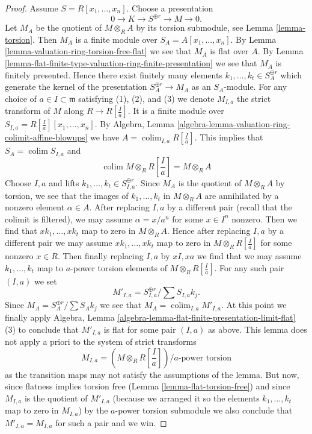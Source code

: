 \documentclass[10pt,a4paper]{amsart}
\theoremstyle{plain}
\theoremstyle{definition}
\theoremstyle{remark}
\numberwithin{equation}{subsection}
\def\colim{\mathop{\mathrm{colim}}\nolimits}
\begin{document}
\begin{proof}
\medskip\noindent
Assume $S = R[x_1, \ldots, x_n]$. Choose a presentation
$$
0 \to K \to S^{\oplus r} \to M \to 0.
$$
Let $M_A$ be the quotient of $M \otimes_R A$ by its torsion submodule, see
Lemma \ref{lemma-torsion}. Then $M_A$ is a finite module over
$S_A = A[x_1, \ldots, x_n]$. By
Lemma \ref{lemma-valuation-ring-torsion-free-flat}
we see that $M_A$ is flat over $A$. By
Lemma \ref{lemma-flat-finite-type-valuation-ring-finite-presentation}
we see that $M_A$ is finitely presented. Hence there exist finitely many
elements $k_1, \ldots, k_t \in S_A^{\oplus r}$ which generate the
kernel of the presentation $S_A^{\oplus r} \to M_A$ as
an $S_A$-module. For any choice of $a \in I \subset \mathfrak m$
satisfying (1), (2), and (3) we denote $M_{I, a}$ the strict transform of
$M$ along $R \to R[\frac{I}{a}]$. It is a finite module over
$S_{I, a} = R[\frac{I}{a}][x_1, \ldots, x_n]$. By
Algebra, Lemma \ref{algebra-lemma-valuation-ring-colimit-affine-blowups}
we have $A = \colim_{I, a} R[\frac{I}{a}]$.
This implies that $S_A = \colim S_{I, a}$ and
$$
\colim M \otimes_R R[\textstyle{\frac{I}{a}}] = M \otimes_R A
$$
Choose $I, a$ and lifts $k_1, \ldots, k_t \in S_{I, a}^{\oplus r}$.
Since $M_A$ is the quotient of $M \otimes_R A$
by torsion, we see that the images of $k_1, \ldots, k_t$ in $M \otimes_R A$
are annihilated by a nonzero element $\alpha \in A$.
After replacing $I, a$ by a different pair
(recall that the colimit is filtered),
we may assume $\alpha = x/a^n$ for some $x \in I^n$ nonzero.
Then we find that $x k_1, \ldots, x k_t$ map to zero in $M \otimes_R A$.
Hence after replacing $I, a$ by a different pair
we may assume $x k_1, \ldots, x k_t$ map to zero in
$M \otimes_R R[\frac{I}{a}]$ for some nonzero $x \in R$.
Then finally replacing $I, a$ by $xI, xa$ we find that we may assume
$k_1, \ldots, k_t$ map to $a$-power torsion elements of
$M \otimes_R R[\frac{I}{a}]$. For any such pair $(I, a)$ we set
$$
M'_{I, a} = S_{I, a}^{\oplus r}/ \sum S_{I, a}k_j.
$$
Since $M_A = S_A^{\oplus r}/ \sum S_Ak_j$ we see that
$M_A = \colim_{I, a} M'_{I, a}$. At this point we finally apply
Algebra, Lemma \ref{algebra-lemma-flat-finite-presentation-limit-flat} (3)
to conclude that $M'_{I, a}$ is flat for some pair $(I, a)$ as above.
This lemma does not apply a priori to the system of strict transforms
$$
M_{I, a} = (M \otimes_R R[\textstyle{\frac{I}{a}}])/a\text{-power torsion}
$$
as the transition maps may not satisfy the assumptions of the lemma.
But now, since flatness implies torsion free
(Lemma \ref{lemma-flat-torsion-free}) and since $M_{I, a}$
is the quotient of $M'_{I, a}$ (because we arranged it so the
elements $k_1, \ldots, k_t$ map to zero in $M_{I, a}$)
by the $a$-power torsion submodule
we also conclude that $M'_{I, a} = M_{I, a}$ for such a pair and we win.
\end{proof}
\end{document}
